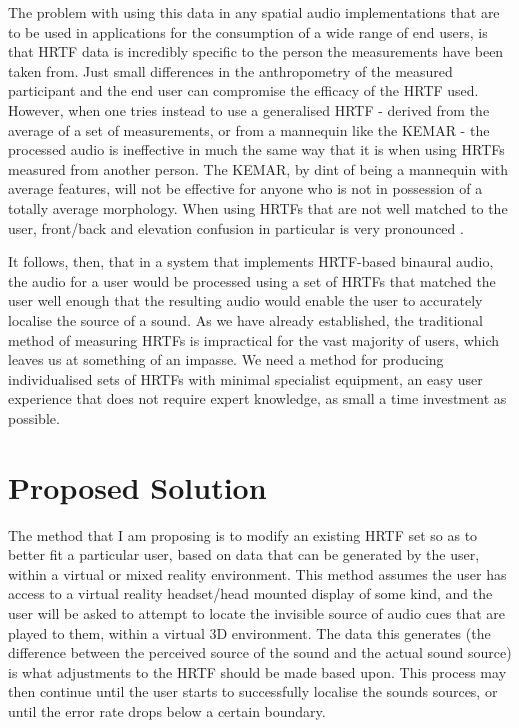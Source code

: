 The problem with using this data in any spatial audio implementations that are to be used in applications for the consumption of a wide range of end users, is that HRTF data is incredibly specific to the person the measurements have been taken from. Just small differences in the anthropometry of the measured participant and the end user can compromise the efficacy of the HRTF used\citep{Middlebrooks1999}. However, when one tries instead to use a generalised HRTF - derived from the average of a set of measurements, or from a mannequin like the KEMAR - the processed audio is ineffective in much the same way that it is when using HRTFs measured from another person. The KEMAR, by dint of being a mannequin with average features, will not be effective for anyone who is not in possession of a totally average morphology. When using HRTFs that are not well matched to the user, front/back and elevation confusion in particular is very pronounced \citep{wenzel1}. 

It follows, then, that in a system that implements HRTF-based binaural audio, the audio for a user would be processed using a set of HRTFs that matched the user well enough that the resulting audio would enable the user to accurately localise the source of a sound. As we have already established, the traditional method of measuring HRTFs is impractical for the vast majority of users, which leaves us at something of an impasse. We need a method for producing individualised sets of HRTFs with minimal specialist equipment, an easy user experience that does not require expert knowledge, as small a time investment as possible. 

\section{Proposed Solution}
The method that I am proposing is to modify an existing HRTF set so as to better fit a particular user, based on data that can be generated by the user, within a virtual or mixed reality environment. This method assumes the user has access to a virtual reality headset/head mounted display of some kind, and the user will be asked to attempt to locate the invisible source of audio cues that are played to them, within a virtual 3D environment. The data this generates (the difference between the perceived source of the sound and the actual sound source) is what adjustments to the HRTF should be made based upon. This process may then continue until the user starts to successfully localise the sounds sources, or until the error rate drops below a certain boundary. 

